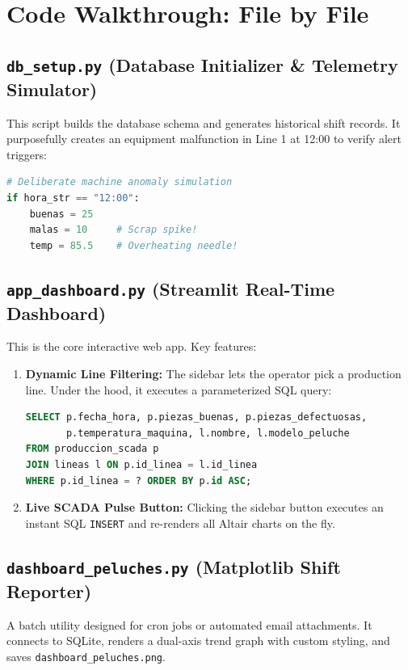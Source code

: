 \documentclass[11pt,letterpaper]{article}
\begin{document}
\section{Code Walkthrough: File by File}

\subsection{\texttt{db\_setup.py} (Database Initializer \& Telemetry Simulator)}
This script builds the database schema and generates historical shift records. It purposefully creates an equipment malfunction in Line 1 at 12:00 to verify alert triggers:
\begin{lstlisting}[language=Python]
# Deliberate machine anomaly simulation
if hora_str == "12:00":
    buenas = 25
    malas = 10     # Scrap spike!
    temp = 85.5    # Overheating needle!
\end{lstlisting}

\subsection{\texttt{app\_dashboard.py} (Streamlit Real-Time Dashboard)}
This is the core interactive web app. Key features:
\begin{enumerate}
    \item \textbf{Dynamic Line Filtering:} The sidebar lets the operator pick a production line. Under the hood, it executes a parameterized SQL query:
\begin{lstlisting}[language=SQL]
SELECT p.fecha_hora, p.piezas_buenas, p.piezas_defectuosas, 
       p.temperatura_maquina, l.nombre, l.modelo_peluche
FROM produccion_scada p
JOIN lineas l ON p.id_linea = l.id_linea
WHERE p.id_linea = ? ORDER BY p.id ASC;
\end{lstlisting}
    \item \textbf{Live SCADA Pulse Button:} Clicking the sidebar button executes an instant SQL \texttt{INSERT} and re-renders all Altair charts on the fly.
\end{enumerate}

\subsection{\texttt{dashboard\_peluches.py} (Matplotlib Shift Reporter)}
A batch utility designed for cron jobs or automated email attachments. It connects to SQLite, renders a dual-axis trend graph with custom styling, and saves \texttt{dashboard\_peluches.png}.
\end{document}
